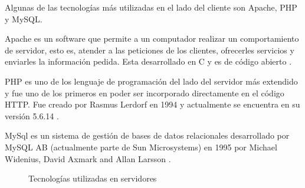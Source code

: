 Algunas de las tecnologías más utilizadas en el lado del cliente son Apache, PHP y MySQL.

Apache es un software que permite a un computador realizar un comportamiento de servidor, esto es, atender a las peticiones de los clientes, ofrecerles servicios y enviarles la información pedida. Esta desarrollado en C y es de código abierto \cite{Apac15}.

PHP es uno de los lenguaje de programación del lado del servidor más extendido y fue uno de los primeros en poder ser incorporado directamente en el código \ac{HTTP}. Fue creado por Rasmus Lerdorf en 1994 y actualmente se encuentra en su versión 5.6.14 \cite{Hist15}.

MySql es un sistema de gestión de bases de datos relacionales desarrollado por MySQL AB (actualmente parte de Sun Microsystems) en 1995 por Michael Widenius, David Axmark and Allan Larsson \cite{Data14}.

\begin{figure}[hbtp]
	\begin{adjustbox}{minipage=\linewidth, fbox}
		\centering
		\hspace{10mm}
		\hspace{10mm}
	\end{adjustbox}
	\caption{Tecnologías utilizadas en servidores}
	\label{fig:mysql_php_apache}
\end{figure}

